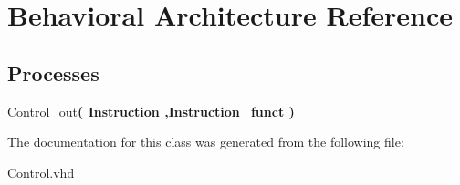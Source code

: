 \hypertarget{class_control_1_1_behavioral}{\section{\-Behavioral \-Architecture \-Reference}
\label{class_control_1_1_behavioral}
}
\*
\*
\subsection*{\-Processes}
 \begin{DoxyCompactItemize}
\item 
\hypertarget{class_control_1_1_behavioral_acb9cc429829d2348a26239aff3f19612}{\hyperlink{class_control_1_1_behavioral_acb9cc429829d2348a26239aff3f19612}{\-Control\-\_\-out}{\bfseries  ( {\bfseries \-Instruction  ,\-Instruction\-\_\-funct } )}}\label{class_control_1_1_behavioral_acb9cc429829d2348a26239aff3f19612}

\end{DoxyCompactItemize}


\-The documentation for this class was generated from the following file\-:\begin{DoxyCompactItemize}
\item 
\-Control.\-vhd\end{DoxyCompactItemize}
